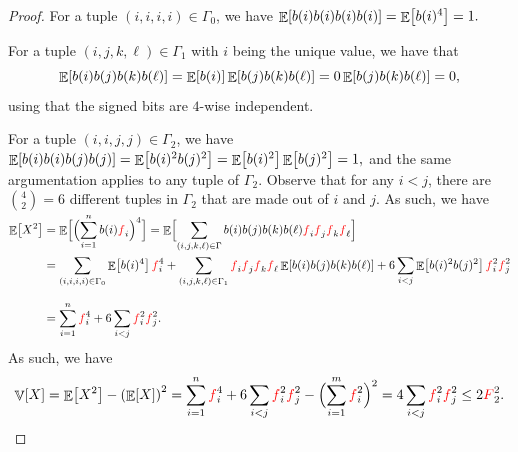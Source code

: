 \begin{proof}
    For a tuple $(i,i,i,i) \in \Gamma_0$, we have
    \begin{math}
        \Ex{b(i) b(i) b(i) b(i)}%
        =%
        \Ex{b(i)^4}%
        =%
        1.
    \end{math}

    \smallskip

    For a tuple $(i,j,k,\ell) \in \Gamma_1$ with $i$ being the unique
    value, we have that
    \begin{equation*}
        \Ex{b(i) b(j) b(k) b(\ell)}
        =%
        \Ex{b(i)} \Ex{ b(j) b(k) b(\ell)}
        =%
        0 \Ex{ b(j) b(k) b(\ell)}
        =%
        0,
    \end{equation*}
    using that the signed bits are $4$-wise independent.

    For a tuple $(i,i,j,j) \in \Gamma_2$, we have
    \begin{math}
        \Ex{b(i) b(i) b(j) b(j)}%
        =%
        \Ex{b(i)^2 b(j)^2}%
        =%
        \Ex{b(i)^2} \Ex{ b(j)^2} =%
        1,
    \end{math}
    and the same argumentation applies to any tuple of $\Gamma_2$.
    Observe that for any $i <j$, there are $\binom{4}{2} = 6$
    different tuples in $\Gamma_2$ that are made out of $i$ and $j$.
    As such, we have
    \begin{align*}
      \Ex{X^2}
      &=
        \Ex{\smash{ \Bigl(  \sum_{i=1}^n b(i) \frq_i \Bigr)^4}
        \Bigr.}%
        =%
        \Ex{\Bigr. \smash{  \sum_{(i,j,k,\ell) \in \Gamma} b(i)b(j)
        b(k) b(\ell)
        \frq_i\frq_j \frq_k \frq_\ell} %
        }
      \\[0.3cm]
      &%
        =%
        \sum_{(i,i,i,i) \in \Gamma_0} \Ex{b(i)^4} \frq_i^4
        + \sum_{(i,j,k,\ell) \in \Gamma_1} \frq_i\frq_j \frq_k
        \frq_\ell \Ex{b(i) b(j) b(k) b(\ell)}
        + 6 \sum_{i < j }  \Ex{b(i)^2 b(j)^2} \frq_i^2 \frq_j^2
      \\[0.3cm]
      &%
        =%
        \sum_{i=1}^n  \frq_i^4
        + 6 \sum_{i < j }  \frq_i^2 \frq_j^2.
    \end{align*}
    As such, we have
    \begin{equation*}
        \Var{X}%
        =%
        \Ex{X^2} - \pth{\Ex{X}}^2%
        = %
        \sum_{i=1}^n  \frq_i^4
        + 6 \sum_{i < j }  \frq_i^2 \frq_j^2
        - \Bigl( \sum_{i=1}^m  \frq_i^2 \Bigr)^2
        =%
        4 \sum_{i < j }  \frq_i^2 \frq_j^2 %
        \leq%
        2 \Frq_2^2.
    \end{equation*}
\end{proof}

